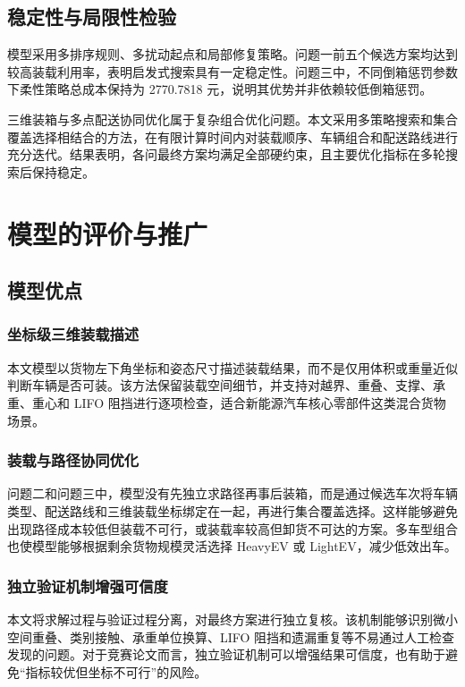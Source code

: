 ﻿\documentclass[UTF8,a4paper,12pt]{ctexart}
\begin{document}
	\subsection{稳定性与局限性检验}
	
	模型采用多排序规则、多扰动起点和局部修复策略。问题一前五个候选方案均达到较高装载利用率，表明启发式搜索具有一定稳定性。问题三中，不同倒箱惩罚参数下柔性策略总成本保持为 2770.7818 元，说明其优势并非依赖较低倒箱惩罚。
	
	三维装箱与多点配送协同优化属于复杂组合优化问题。本文采用多策略搜索和集合覆盖选择相结合的方法，在有限计算时间内对装载顺序、车辆组合和配送路线进行充分迭代。结果表明，各问最终方案均满足全部硬约束，且主要优化指标在多轮搜索后保持稳定。
	
	\section{模型的评价与推广}
	
	\subsection{模型优点}
	
	\subsubsection{坐标级三维装载描述}
	
	本文模型以货物左下角坐标和姿态尺寸描述装载结果，而不是仅用体积或重量近似判断车辆是否可装。该方法保留装载空间细节，并支持对越界、重叠、支撑、承重、重心和 LIFO 阻挡进行逐项检查，适合新能源汽车核心零部件这类混合货物场景。
	
	\subsubsection{装载与路径协同优化}
	
	问题二和问题三中，模型没有先独立求路径再事后装箱，而是通过候选车次将车辆类型、配送路线和三维装载坐标绑定在一起，再进行集合覆盖选择。这样能够避免出现路径成本较低但装载不可行，或装载率较高但卸货不可达的方案。多车型组合也使模型能够根据剩余货物规模灵活选择 HeavyEV 或 LightEV，减少低效出车。
	
	\subsubsection{独立验证机制增强可信度}
	
	本文将求解过程与验证过程分离，对最终方案进行独立复核。该机制能够识别微小空间重叠、类别接触、承重单位换算、LIFO 阻挡和遗漏重复等不易通过人工检查发现的问题。对于竞赛论文而言，独立验证机制可以增强结果可信度，也有助于避免“指标较优但坐标不可行”的风险。
	
\end{document}
